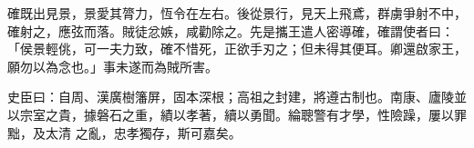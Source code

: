 \begin{pinyinscope}
 確既出見景，景愛其膂力，恆令在左右。後從景行，見天上飛鳶，群虜爭射不中，確射之，應弦而落。賊徒忿嫉，咸勸除之。先是攜王遣人密導確，確謂使者曰：「侯景輕佻，可一夫力致，確不惜死，正欲手刃之；但未得其便耳。卿還啟家王，願勿以為念也。」事未遂而為賊所害。



 史臣曰：自周、漢廣樹籓屏，固本深根；高祖之封建，將遵古制也。南康、廬陵並以宗室之貴，據磐石之重，績以孝著，續以勇聞。綸聰警有才學，性險躁，屢以罪黜，及太清
 之亂，忠孝獨存，斯可嘉矣。



\end{pinyinscope}